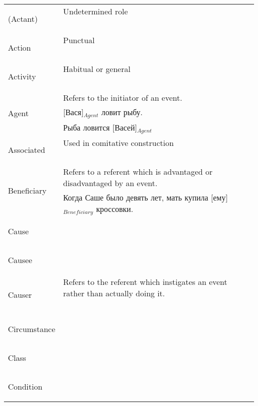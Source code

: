 \documentclass[a4paper,11pt, onecolumn,twoside]{article}
\begin{document}
\begin{longtable}{ p{}  p{} } 
\toprule
 \multirow{2}{*}{(Actant)} & Undetermined role \\ 
        & ~ \\
\midrule
 \multirow{2}{*}{Action} & Punctual  \\ 
        & ~ \\
\midrule
 \multirow{2}{*}{Activity} & Habitual or general \\ 
        & ~ \\
\midrule
 \multirow{3}{*}{Agent} & Refers to the initiator of an event. \\ 
        & [Вася]$_{Agent}$ ловит рыбу. \\
        & Рыба ловится [Васей]$_{Agent}$ \\
\midrule
 \multirow{2}{*}{Associated} & Used in comitative construction \\ 
        & ~ \\
\midrule
 \multirow{2}{*}{Beneficiary} & Refers to a referent which is advantaged or disadvantaged by an event. \\ 
        & Когда Саше было девять лет, мать купила [ему]$_{Beneficiary}$ кроссовки. \\
\midrule
 \multirow{2}{*}{Cause} & ~ \\ 
        & ~ \\
\midrule
 \multirow{2}{*}{Causee} & ~ \\ 
        & ~ \\
\midrule
 \multirow{2}{*}{Causer} & Refers to the referent which instigates an event rather than actually doing it. \\ 
        & ~ \\
\midrule
 \multirow{2}{*}{Circumstance} & ~ \\ 
        & ~ \\
\midrule
 \multirow{2}{*}{Class} & ~ \\ 
        & ~ \\
\midrule
 \multirow{2}{*}{Condition} & ~ \\ 
        & ~ \\

\end{longtable}
\end{document}
